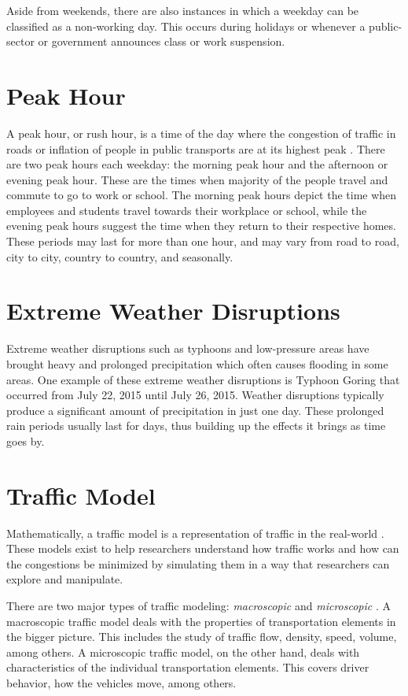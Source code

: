 Aside from weekends, there are also instances in which a weekday can be classified as a non-working day. This occurs during holidays or whenever a public-sector or government announces class or work suspension.



\section{Peak Hour}
A peak hour, or rush hour, is a time of the day where the congestion of traffic in roads or inflation of people in public transports are at its highest peak . There are two peak hours each weekday: the morning peak hour and the afternoon or evening peak hour. These are the times when majority of the people travel and commute to go to work or school. The morning peak hours depict the time when employees and students travel towards their workplace or school, while the evening peak hours suggest the time when they return to their respective homes. These periods may last for more than one hour, and may vary from road to road, city to city, country to country, and seasonally. 
\section{Extreme Weather Disruptions}
Extreme weather disruptions such as typhoons and low-pressure areas have brought heavy and prolonged precipitation which often causes flooding in some areas. One example of these extreme weather disruptions is Typhoon Goring that occurred from July 22, 2015 until July 26, 2015. Weather disruptions typically produce a significant amount of precipitation in just one day. These prolonged rain periods usually last for days, thus building up the effects it brings as time goes by.





\section{Traffic Model}
Mathematically, a traffic model is a representation of traffic in the real-world . These models exist to help researchers understand how traffic works and how can the congestions be minimized by simulating them in a way that researchers can explore and manipulate. 

There are two major types of traffic modeling: \textit{macroscopic} and \textit{microscopic} . A macroscopic traffic model deals with the properties of transportation elements in the bigger picture. This includes the study of traffic flow, density, speed, volume, among others. A microscopic traffic model, on the other hand, deals with characteristics of the individual transportation elements. This covers driver behavior, how the vehicles move, among others. 




